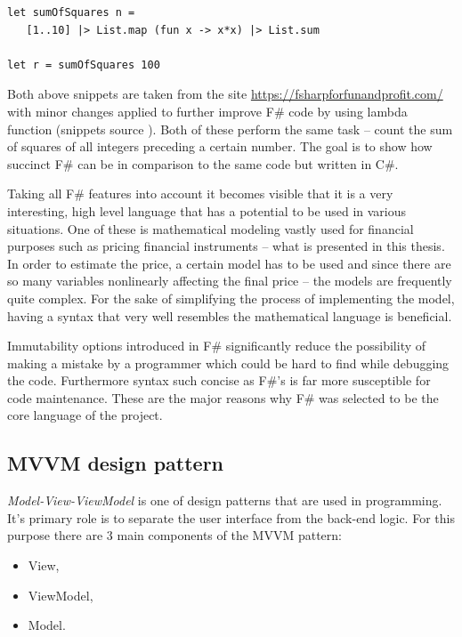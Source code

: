     \begin{lstlisting}[caption=F\# code example]
let sumOfSquares n = 
   [1..10] |> List.map (fun x -> x*x) |> List.sum

let r = sumOfSquares 100
    \end{lstlisting}
    
    Both above snippets are taken from the site \url{https://fsharpforfunandprofit.com/} with minor changes applied to further improve F\# code by using lambda function (snippets source \cite{compareCandF}). Both of these perform the same task -- count the sum of squares of all integers preceding a certain number. The goal is to show how succinct F\# can be in comparison to the same code but written in C\#.
    
    Taking all F\# features into account it becomes visible that it is a very interesting, high level language that has a potential to be used in various situations. One of these is mathematical modeling vastly used for financial purposes such as pricing financial instruments -- what is presented in this thesis. In order to estimate the price, a certain model has to be used and since there are so many variables nonlinearly affecting the final price -- the models are frequently quite complex. For the sake of simplifying the process of implementing the model, having a syntax that very well resembles the mathematical language is beneficial.
    
    Immutability options introduced in F\# significantly reduce the possibility of making a mistake by a programmer which could be hard to find while debugging the code. Furthermore syntax such concise as F\#'s is far more susceptible for code maintenance.
    These are the major reasons why F\# was selected to be the core language of the project.
\subsection{MVVM design pattern}
    \textit{Model-View-ViewModel} is one of design patterns that are used in programming. It's primary role is to separate the user interface from the  back-end logic. For this purpose there are 3 main components of the MVVM pattern:
    \begin{itemize}
        \item View,
        \item ViewModel,
        \item Model.
    \end{itemize}
    
